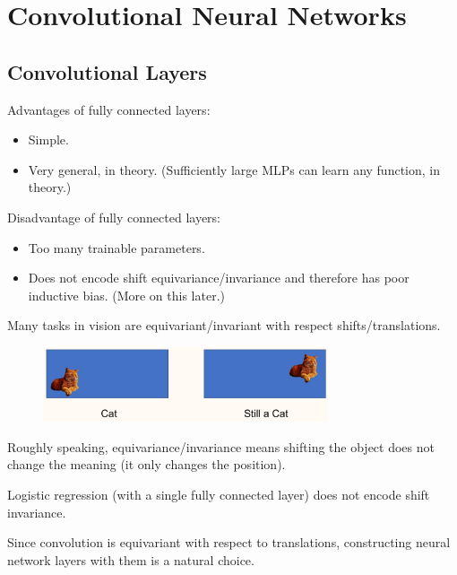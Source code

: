 \documentclass{report}
\begin{document}
\chapter{Convolutional Neural Networks}

\section{Convolutional Layers}

\begin{concept}
    Advantages of fully connected layers:

    \begin{itemize}
        \item Simple.
        \item Very general, in theory. (Sufficiently large MLPs can learn any function, in theory.)
    \end{itemize}

    Disadvantage of fully connected layers:

    \begin{itemize}
        \item Too many trainable parameters.
        \item Does not encode shift equivariance/invariance and therefore has poor inductive bias. (More on this later.)
    \end{itemize}
\end{concept}

\begin{concept}
    Many tasks in vision are equivariant/invariant with respect shifts/translations.

    \begin{figure}[H]
        \centering
        \includegraphics[width=0.75\textwidth]{.././assets/5.1.png}
    \end{figure}

    Roughly speaking, equivariance/invariance means shifting the object does not change the meaning (it only changes the position).

    Logistic regression (with a single fully connected layer) does not encode shift invariance.

    Since convolution is equivariant with respect to translations, constructing neural network layers with them is a natural choice.
\end{concept}
\end{document}
